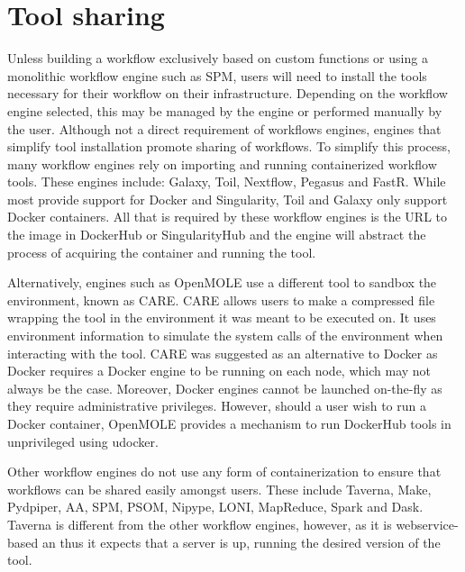 \documentclass{report}
\begin{document}
       \section{Tool sharing}\label{sharing}

            Unless building a workflow exclusively based on custom
            functions or using a monolithic workflow engine such as SPM, users
            will need to install the tools necessary for their workflow on
            their infrastructure. Depending on the workflow engine 
            selected, this may be managed by the engine or performed manually 
            by the user. Although not a direct requirement of workflows engines, 
            engines that simplify tool installation promote sharing of 
            workflows. To simplify this process, many workflow engines rely on 
            importing and running containerized workflow tools. These engines
            include: Galaxy, Toil, Nextflow, Pegasus and FastR. While most 
            provide support for Docker and Singularity, Toil and Galaxy only 
            support Docker containers. All that is required by these workflow 
            engines is the URL to the image in DockerHub or SingularityHub and
            the engine will abstract the process of acquiring the container and
            running the tool.

            Alternatively, engines such as OpenMOLE use a different tool to
            sandbox the environment, known as CARE. CARE allows 
            users to make a compressed file wrapping the tool in the 
            environment it was meant to be executed on. It uses environment 
            information to simulate the system calls of the environment when
            interacting with the tool. CARE was suggested as an alternative to
            Docker as Docker requires a Docker engine to be running on each 
            node, which may not always be the case. Moreover, Docker engines 
            cannot be launched on-the-fly as they require administrative 
            privileges. However, should a user wish to run a Docker container,
            OpenMOLE provides a mechanism to run DockerHub tools in 
            unprivileged using udocker.

            Other workflow engines do not use any form of containerization to
            ensure that workflows can be shared easily amongst users. These 
            include Taverna, Make, Pydpiper, AA, SPM, PSOM, Nipype, LONI, 
            MapReduce, Spark and Dask.
            Taverna is different from the other workflow engines, however, as 
            it is webservice-based an thus it expects that a server is up, 
            running the desired version of the tool.
\end{document}
